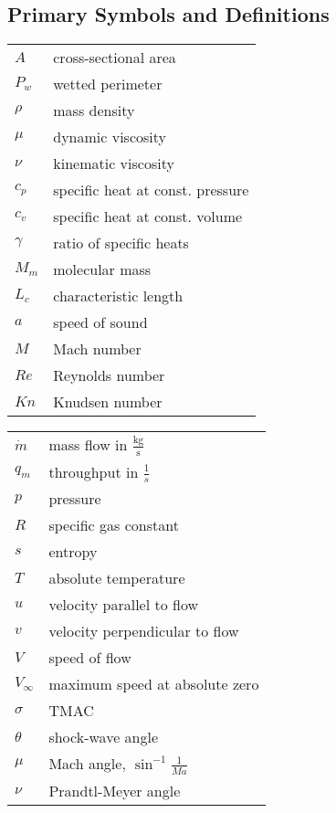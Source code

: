 \subsection*{Primary Symbols and Definitions}

\renewcommand{\arraystretch}{1.2}
\begin{multicols}{2}
\begin{flushleft}
\begin{tabular}{ll}
$A$         & cross-sectional area \\
$P_w$       & wetted perimeter \\
$\rho$      & mass density \\
$\mu$       & dynamic viscosity \\
$\nu$       & kinematic viscosity \\
$c_p$       & specific heat at const. pressure \\
$c_v$       & specific heat at const. volume \\
$\gamma$    & ratio of specific heats \\
$M_m$       & molecular mass \\
$L_c$       & characteristic length \\
$a$         & speed of sound \\
$M$         & Mach number \\
$Re$        & Reynolds number \\ 
$Kn$        & Knudsen number \\
\end{tabular}
\end{flushleft}
\columnbreak
\begin{flushleft}
\begin{tabular}{ll}
$\dot{m}$   & mass flow in $\frac{\text{kg}}{\text{s}}$ \\
$q_m$       & throughput in $\frac{1}{s}$ \\
$p$         & pressure \\
$R$         & specific gas constant \\
$s$         & entropy\\
$T$         & absolute temperature \\
$u$         & velocity parallel to flow \\
$v$         & velocity perpendicular to flow \\
$V$         & speed of flow \\
$V_\infty$  & maximum speed at absolute zero\\
$\sigma$    & TMAC \\
$\theta$    & shock-wave angle \\
$\mu$       & Mach angle, $\sin^{-1}\frac{1}{Ma}$ \\
$\nu$       & Prandtl-Meyer angle \\
\end{tabular}
\end{flushleft}
\end{multicols}


